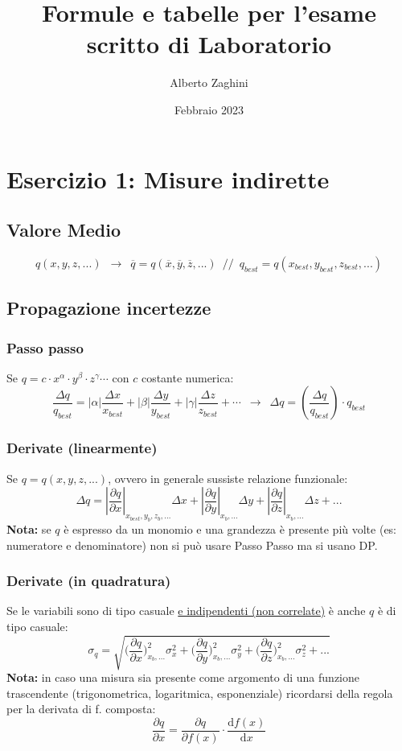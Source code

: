 \documentclass[11pt]{article}
\title{Formule e tabelle per l'esame scritto di Laboratorio}
\author{Alberto Zaghini}
\date{Febbraio 2023}
\begin{document}
\maketitle

\section{Esercizio 1: Misure indirette}
\subsection{Valore Medio}
\[q(x, y, z, ...) \enspace \rightarrow \enspace \overline{q} = q(\overline{x}, \overline{y}, \overline{z}, ...) \enspace // \enspace q_{best} = q(x_{best}, y_{best}, z_{best}, ...)\]
\subsection{Propagazione incertezze}
\subsubsection*{Passo passo}
Se $q = c \cdot x^\alpha \cdot y^\beta \cdot z^\gamma \cdots$ con $c$ costante numerica: 
\[\frac{\Delta q}{q_{best}} = |\alpha| \frac{\Delta x}{x_{best}} + |\beta| \frac{\Delta y}{y_{best}} + |\gamma| \frac{\Delta z}{z_{best}} + \cdots \enspace \rightarrow \enspace \Delta q = (\frac{\Delta q}{q_{best}}) \cdot q_{best}\]

\subsubsection*{Derivate (linearmente)}
Se $q = q(x, y, z, ...)$, ovvero in generale sussiste relazione funzionale:
\[\Delta q = \left|\frac{\partial q}{\partial x}\right|_{x_{best}, y_{b}, z_{b}, ...} \Delta x + \left|\frac{\partial q}{\partial y}\right|_{x_{b}, ...} \Delta y + \left|\frac{\partial q}{\partial z}\right|_{x_{b}, ...} \Delta z + ...\]
\textbf{Nota: } se $q$ è espresso da un monomio e una grandezza è presente più volte (es: numeratore e denominatore) non si può usare Passo Passo ma si usano DP.

\subsubsection*{Derivate (in quadratura)}
Se le variabili sono di tipo casuale \underline{e indipendenti (non correlate)} è anche $q$ è di tipo casuale:
\[\sigma_q = \sqrt{\bigg(\frac{\partial q}{\partial x}\bigg)^2_{x_{b}, ...} \sigma_x^2 + \bigg(\frac{\partial q}{\partial y}\bigg)^2_{x_{b}, ...} \sigma_y^2 + \bigg(\frac{\partial q}{\partial z}\bigg)^2_{x_{b}, ...} \sigma_z^2 + ...}\]
\textbf{Nota:} in caso una misura sia presente come argomento di una funzione trascendente (trigonometrica, logaritmica, esponenziale) ricordarsi della regola per la derivata di f. composta:
\[\frac{\partial q}{\partial x} = \frac{\partial q}{\partial f(x)} \cdot \frac{\mathrm{d} f(x)}{\mathrm{d} x}\]
\end{document}
